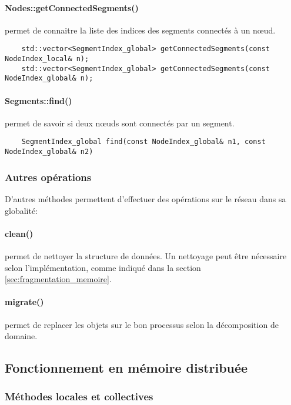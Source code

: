 \paragraph{Nodes::getConnectedSegments()} permet de connaitre la liste des indices des segments connectés à un nœud.
\begin{verbatim}
	std::vector<SegmentIndex_global> getConnectedSegments(const NodeIndex_local& n);
	std::vector<SegmentIndex_global> getConnectedSegments(const NodeIndex_global& n);
\end{verbatim}

\paragraph{Segments::find()} permet de savoir si deux nœuds sont connectés par un segment.
\begin{verbatim}
	SegmentIndex_global find(const NodeIndex_global& n1, const NodeIndex_global& n2)
\end{verbatim}

\subsubsection{Autres opérations}

D'autres méthodes permettent d'effectuer des opérations sur le réseau dans sa globalité:

\paragraph{clean()} permet de nettoyer la structure de données. Un nettoyage peut être nécessaire selon l'implémentation, comme indiqué dans la section \ref{sec:fragmentation_memoire}.

\paragraph{migrate()} permet de replacer les objets sur le bon processus selon la décomposition de domaine.

\subsection{Fonctionnement en mémoire distribuée}
\label{sec:TAD-distribué}

\subsubsection{Méthodes locales et collectives}

